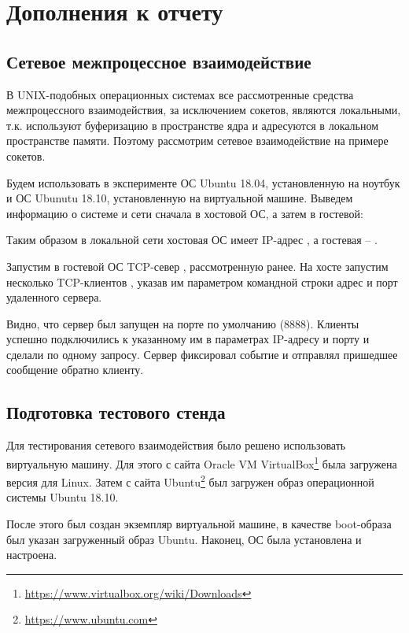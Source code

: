 \section*{Дополнения к отчету}

\subsection*{Сетевое межпроцессное взаимодействие}

В UNIX-подобных операционных системах все рассмотренные средства межпроцессного взаимодействия, за исключением сокетов, являются локальными, т.к. используют буферизацию в пространстве ядра и адресуются в локальном пространстве памяти. Поэтому рассмотрим сетевое взаимодействие на примере сокетов.

Будем использовать в эксперименте  ОС Ubuntu 18.04, установленную на ноутбук и ОС Ubunutu 18.10, установленную на виртуальной машине. Выведем информацию о системе и сети сначала в хостовой ОС, а затем в гостевой:



\noindent Таким образом в локальной сети хостовая ОС имеет IP-адрес , а гостевая -- .

Запустим в гостевой ОС TCP-север , рассмотренную ранее. На хосте запустим несколько TCP-клиентов , указав им параметром командной строки адрес и порт удаленного сервера.




Видно, что сервер был запущен на порте по умолчанию (8888). Клиенты успешно подключились к указанному им в параметрах IP-адресу и порту и сделали по одному запросу. Сервер фиксировал событие и отправлял пришедшее сообщение обратно клиенту.

\subsection*{Подготовка тестового стенда}

Для тестирования сетевого взаимодействия было решено использовать виртуальную машину. Для этого с сайта Oracle VM VirtualBox\footnote{\url{https://www.virtualbox.org/wiki/Downloads}} была загружена версия для Linux. Затем с сайта Ubuntu\footnote{\url{https://www.ubuntu.com}} был загружен  образ операционной системы Ubuntu 18.10. 

После этого был создан экземпляр виртуальной машине, в качестве boot-образа был указан загруженный образ Ubuntu. Наконец, ОС была установлена и настроена.


